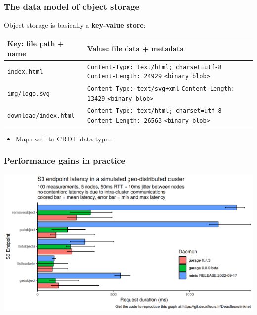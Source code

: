 \documentclass[aspectratio=169,xcolor={svgnames}]{beamer}
\begin{document}
\begin{frame}
	\frametitle{The data model of object storage}
	Object storage is basically a \textbf{key-value store}:
	\vspace{.5em}

	{\scriptsize
		\begin{center}
		\begin{tabular}{|l|p{7cm}|}
			\hline
			\textbf{Key: file path + name} & \textbf{Value: file data + metadata} \\
			\hline
			\hline
			\texttt{index.html} &
				\texttt{Content-Type: text/html; charset=utf-8} \newline
				\texttt{Content-Length: 24929} \newline
				\texttt{<binary blob>} \\ 
			\hline
			\texttt{img/logo.svg} &
				\texttt{Content-Type: text/svg+xml} \newline
				\texttt{Content-Length: 13429} \newline
				\texttt{<binary blob>} \\ 
			\hline
			\texttt{download/index.html} &
				\texttt{Content-Type: text/html; charset=utf-8} \newline
				\texttt{Content-Length: 26563} \newline
				\texttt{<binary blob>} \\ 
			\hline
		\end{tabular}
		\end{center}
		}

	\vspace{1em}
	\begin{itemize}
		\item<2> Maps well to CRDT data types
	\end{itemize}
\end{frame}

\begin{frame}
	\frametitle{Performance gains in practice}
	\begin{center}
		\includegraphics[width=.8\linewidth]{../assets/perf/endpoint_latency_0.7_0.8_minio.png}
	\end{center}
\end{frame}
\end{document}
